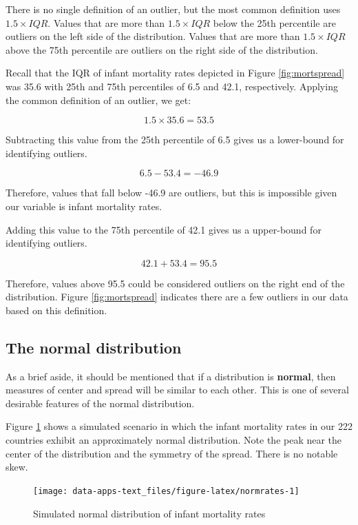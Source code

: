\documentclass[
]{book}
\begin{document}
There is no single definition of an outlier, but the most common definition uses \(1.5 \times IQR\). Values that are more than \(1.5 \times IQR\) below the 25th percentile are outliers on the left side of the distribution. Values that are more than \(1.5 \times IQR\) above the 75th percentile are outliers on the right side of the distribution.

Recall that the IQR of infant mortality rates depicted in Figure \ref{fig:mortspread} was 35.6 with 25th and 75th percentiles of 6.5 and 42.1, respectively. Applying the common definition of an outlier, we get:

\[1.5 \times 35.6 = 53.5\]

Subtracting this value from the 25th percentile of 6.5 gives us a lower-bound for identifying outliers.

\[6.5-53.4=-46.9\]

Therefore, values that fall below -46.9 are outliers, but this is impossible given our variable is infant mortality rates.

Adding this value to the 75th percentile of 42.1 gives us a upper-bound for identifying outliers.

\[42.1+53.4=95.5\]

Therefore, values above 95.5 could be considered outliers on the right end of the distribution. Figure \ref{fig:mortspread} indicates there are a few outliers in our data based on this definition.

\hypertarget{the-normal-distribution}{%
\subsection{The normal distribution}\label{the-normal-distribution}}

As a brief aside, it should be mentioned that if a distribution is \textbf{normal}, then measures of center and spread will be similar to each other. This is one of several desirable features of the normal distribution.

Figure \ref{fig:normrates} shows a simulated scenario in which the infant mortality rates in our 222 countries exhibit an approximately normal distribution. Note the peak near the center of the distribution and the symmetry of the spread. There is no notable skew.

\begin{figure}

{\centering \texttt{[image: data-apps-text\_files/figure-latex/normrates-1]} 

}

\caption{Simulated normal distribution of infant mortality rates}\label{fig:normrates}
\end{figure}
\end{document}
